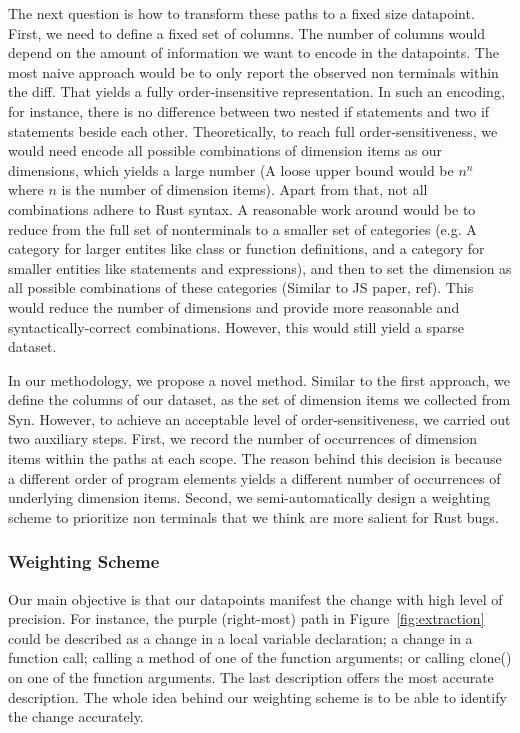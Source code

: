 The next question is how to transform these paths to a fixed size datapoint. First, we need to define a fixed set of columns. The number of columns would depend on the amount of information we want to encode in the datapoints. The most naive approach would be to only report the observed non terminals within the diff. That yields a fully order-insensitive representation. In such an encoding, for instance, there is no difference between two nested if statements and two if statements beside each other. Theoretically, to reach full order-sensitiveness, we would need encode all possible combinations of dimension items as our dimensions, which yields a large number (A loose upper bound would be $n^n$ where $n$ is the number of dimension items). Apart from that, not all combinations adhere to Rust syntax. A reasonable work around would be to reduce from the full set of nonterminals to a smaller set of categories (e.g. A category for larger entites like class or function definitions, and a category for smaller entities like statements and expressions), and then to set the dimension as all possible combinations of these categories (Similar to JS paper, ref). This would reduce the number of dimensions and provide more reasonable and syntactically-correct combinations. However, this would still yield a sparse dataset. 

In our methodology, we propose a novel method. Similar to the first approach, we define the columns of our dataset, as the set of dimension items we collected from Syn. However, to achieve an acceptable level of order-sensitiveness, we carried out two auxiliary steps. First, we record the number of occurrences of dimension items within the paths at each scope. The reason behind this decision is because a different order of program elements yields a different number of occurrences of underlying dimension items. Second, we semi-automatically design a weighting scheme to prioritize non terminals that we think are more salient for Rust bugs.

\subsubsection{\label{sec:weighting_scheme}Weighting Scheme}

Our main objective is that our datapoints manifest the change with high level of precision. For instance, the purple (right-most) path in Figure~\ref{fig:extraction} could be described as a change in a local variable declaration; a change in a function call; calling a method of one of the function arguments; or calling clone() on one of the function arguments. The last description offers the most accurate description. The whole idea behind our weighting scheme is to be able to identify the change accurately. 

